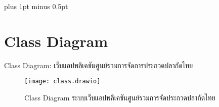 
\clearpage
\thispagestyle{plain}

\begingroup
\fontsize{16pt}{19.2pt}\selectfont
\justifying
\XeTeXlinebreakskip=0pt plus 1pt minus 0.5pt
\setlength{\parindent}{1.5cm}
\setlength{\parskip}{0pt}


\section*{Class Diagram}

\indent Class Diagram: เว็บแอปพลิเคชันศูนย์รวมการจัดการประกวดปลากัดไทย

\vspace{\baselineskip}

\begin{figure}[h]
	\centering
	\texttt{[image: class.drawio]}
	\caption{Class Diagram ระบบเว็บแอปพลิเคชันศูนย์รวมการจัดประกวดปลากัดไทย}
\end{figure}

\clearpage